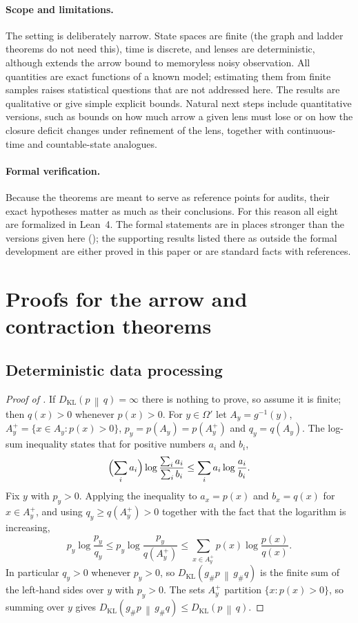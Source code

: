\documentclass[11pt]{article}
\theoremstyle{definition}
\newcommand{\1}{\mathbf{1}}
\newcommand{\DKL}[2]{D_{\mathrm{KL}}\!\left(#1\,\middle\|\,#2\right)}
\begin{document}
\paragraph{Scope and limitations.}
The setting is deliberately narrow.
State spaces are finite (the graph and ladder theorems do not need this), time is discrete, and lenses are deterministic, although  extends the arrow bound to memoryless noisy observation.
All quantities are exact functions of a known model; estimating them from finite samples raises statistical questions that are not addressed here.
The results are qualitative or give simple explicit bounds.
Natural next steps include quantitative versions, such as bounds on how much arrow a given lens must lose or on how the closure deficit changes under refinement of the lens, together with continuous-time and countable-state analogues.

\paragraph{Formal verification.}
Because the theorems are meant to serve as reference points for audits, their exact hypotheses matter as much as their conclusions.
For this reason all eight are formalized in Lean~4.
The formal statements are in places stronger than the versions given here (); the supporting results listed there as outside the formal development are either proved in this paper or are standard facts with references.
 
\appendix
{}
\section{Proofs for the arrow and contraction theorems}\label{app:probkl}

\subsection{Deterministic data processing}

\begin{proof}[Proof of ]
If $\DKL{p}{q}=\infty$ there is nothing to prove, so assume it is finite; then $q(x)>0$ whenever $p(x)>0$.
For $y\in\Omega'$ let $A_y=g^{-1}(y)$, $A^+_y=\{x\in A_y:p(x)>0\}$, $p_y=p(A_y)=p(A_y^+)$ and $q_y=q(A_y)$.
The log-sum inequality \citep{CoverThomas2006} states that for positive numbers $a_i$ and $b_i$,
\[
  \Bigl(\sum_i a_i\Bigr)\log\frac{\sum_ia_i}{\sum_ib_i}\le\sum_i a_i\log\frac{a_i}{b_i}.
\]
Fix $y$ with $p_y>0$.
Applying the inequality to $a_x=p(x)$ and $b_x=q(x)$ for $x\in A^+_y$, and using $q_y\ge q(A^+_y)>0$ together with the fact that the logarithm is increasing,
\[
  p_y\log\frac{p_y}{q_y}\le p_y\log\frac{p_y}{q(A^+_y)}\le\sum_{x\in A^+_y}p(x)\log\frac{p(x)}{q(x)}.
\]
In particular $q_y>0$ whenever $p_y>0$, so $\DKL{g_\#p}{g_\#q}$ is the finite sum of the left-hand sides over $y$ with $p_y>0$.
The sets $A^+_y$ partition $\{x:p(x)>0\}$, so summing over $y$ gives $\DKL{g_{\#}p}{g_{\#}q}\le\DKL{p}{q}$.
\end{proof}
\end{document}
